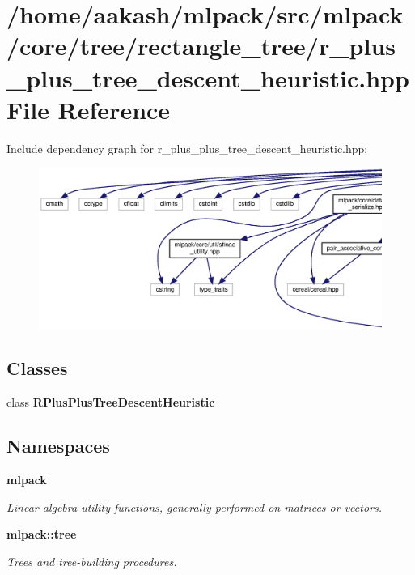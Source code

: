 \section{/home/aakash/mlpack/src/mlpack/core/tree/rectangle\+\_\+tree/r\+\_\+plus\+\_\+plus\+\_\+tree\+\_\+descent\+\_\+heuristic.hpp File Reference}
\label{r__plus__plus__tree__descent__heuristic_8hpp}
Include dependency graph for r\+\_\+plus\+\_\+plus\+\_\+tree\+\_\+descent\+\_\+heuristic.\+hpp\+:
\nopagebreak
\begin{figure}[H]
\begin{center}
\leavevmode
\includegraphics[width=350pt]{r__plus__plus__tree__descent__heuristic_8hpp__incl}
\end{center}
\end{figure}
\subsection*{Classes}
\begin{DoxyCompactItemize}
\item 
class \textbf{ R\+Plus\+Plus\+Tree\+Descent\+Heuristic}
\end{DoxyCompactItemize}
\subsection*{Namespaces}
\begin{DoxyCompactItemize}
\item 
 \textbf{ mlpack}
\begin{DoxyCompactList}\small\item\em Linear algebra utility functions, generally performed on matrices or vectors. \end{DoxyCompactList}\item 
 \textbf{ mlpack\+::tree}
\begin{DoxyCompactList}\small\item\em Trees and tree-\/building procedures. \end{DoxyCompactList}\end{DoxyCompactItemize}


